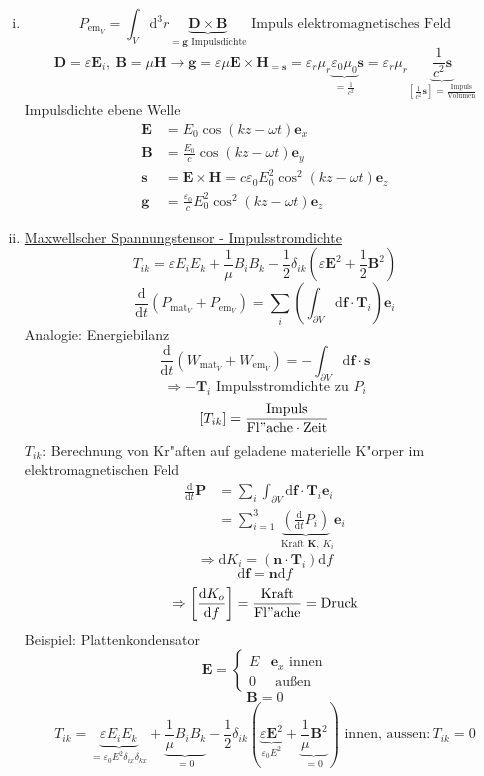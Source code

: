 \documentclass[titlepage,11pt,a4paper,ngerman]{report}
\newcommand{\tx}[1]{\textrm{#1}}
\newcommand{\dd}{\tx{d}}
\renewcommand{\vec}[1]{\boldsymbol{#1}}
\renewcommand{\epsilon}{\varepsilon}
\begin{document}
\begin{enumerate}[i)]
\item \[P_{\mathrm{em}_V}=\int_V\dd^3r\underbrace{\vec{D}\times\vec{B}}_{=\vec{g}\textrm{ Impulsdichte}}\textrm{ Impuls elektromagnetisches Feld}\]
\[\vec{D}=\epsilon\vec{E}_i,\ \vec{B}=\mu\vec{H}\rightarrow\vec{g}=\epsilon\mu{\vec{E}\times\vec{H}}_{=\vec{s}}=\epsilon_r\mu_r\underbrace{\epsilon_0\mu_0}_{=\frac{1}{c^2}}\vec{s}=\epsilon_r\mu_r\underbrace{\frac{1}{c^2}\vec{s}}_{\left[\frac{1}{c^2}\vec{s}\right]=\frac{\mathrm{Impuls}}{\mathrm{Volumen}}}\]
Impulsdichte ebene Welle
\begin{align*}\vec{E}&=E_0\cos(kz-\omega t)\vec{e}_x\\
\vec{B}&=\frac{E_0}{c}\cos(kz-\omega t)\vec{e}_y\\
\vec{s}&=\vec{E}\times\vec{H}=c\epsilon_0E_0^2\cos^2(kz-\omega t)\vec{e}_z\\
\vec{g}&=\frac{\epsilon_0}{c}E_0^2\cos^2(kz-\omega t)\vec{e}_z\end{align*}
\item \underline{Maxwellscher Spannungstensor - Impulsstromdichte}
\[T_{ik}=\epsilon E_iE_k+\frac{1}{\mu}B_iB_k-\frac{1}{2}\delta_{ik}(\epsilon\vec{E}^2+\frac{1}{2}\vec{B}^2)\]
\[\frac{\dd}{\dd t}(P_{\mathrm{mat}_V}+P_{\mathrm{em}_V})=\sum_i\left(\int_{\partial V}\dd\vec{f}\cdot\vec{T}_i\right)\vec{e}_i\]
Analogie: Energiebilanz
\[\frac{\dd}{\dd t}(W_{\mathrm{mat}_V}+W_{\mathrm{em}_V})=-\int_{\partial V}\dd\vec{f}\cdot\vec{s}\]
\[\Rightarrow-\vec{T}_i\textrm{ Impulsstromdichte zu }P_i\]
\[\left[T_{ik}\right]=\mathrm{\frac{Impuls}{Fl"ache\cdot Zeit}}\]
$T_{ik}$: Berechnung von Kr"aften auf geladene materielle K"orper im elektromagnetischen Feld
\begin{align*}\frac{\dd}{\dd t}\vec{P}&=\sum_i\int_{\partial V}\dd\vec{f}\cdot\vec{T}_i\vec{e}_i\\
&=\sum_{i=1}^3\underbrace{\left(\frac{\dd}{\dd t}P_i\right)}_{\textrm{ Kraft }\vec{K},\ K_i}\vec{e}_i\end{align*}
\[\Rightarrow\dd K_i=(\vec{n}\cdot\vec{T}_i)\dd f\]
\[\dd\vec{f}=\vec{n}\dd f\]
\[\Rightarrow\left[\frac{\dd K_o}{\dd f}\right]=\mathrm{\frac{Kraft}{Fl"ache}}=\mathrm{Druck}\]
Beispiel: Plattenkondensator
\[\vec{E}=\begin{cases}E&\vec{e}_x\textrm{ innen}\\0&\textrm{ au\ss en}\end{cases}\]
\[\vec{B}=0\]
\[T_{ik}=\underbrace{\epsilon E_iE_k}_{=\epsilon_0E^2\delta_{ix}\delta_{kx}}+\underbrace{\frac{1}{\mu}B_iB_k}_{=0}-\frac{1}{2}\delta_{ik}(\underbrace{\epsilon\vec{E}^2}_{\epsilon_0E^2}+\underbrace{\frac{1}{\mu}\vec{B}^2}_{=0})\textrm{ innen, aussen}:T_{ik}=0\]

\end{enumerate}
\end{document}
